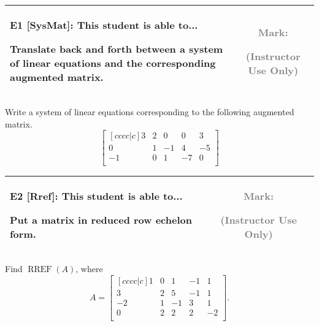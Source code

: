 \documentclass[12pt]{article}
\newcommand{\standardQuestion}[2]{
\begin{center}
  \begin{tabular}{|l|c|}
  \hline
    \parbox{5in}{
      \textbf{#1}: This student is able to...\\
      #2
    }
  &
    \parbox{1in}{
      \vspace{0.1in}
      \footnotesize \textcolor{gray}{Mark:}
      \vspace{0.7in}

      \tiny \textcolor{gray}{(Instructor Use Only)}
    }
  \\\hline
  \end{tabular}
\end{center}
}
\begin{document}




\standardQuestion{E1 [SysMat]}{
  Translate back and forth between a system of linear equations and the corresponding augmented matrix.
}

Write a system of linear equations corresponding to the following
augmented matrix.
\[
\begin{bmatrix}[cccc|c]
3 & 2 & 0 & 0 & 3 \\
0 & 1 & -1 & 4 & -5 \\
-1 & 0 & 1 & -7 & 0 \\
\end{bmatrix}
\]


\newpage



\standardQuestion{E2 [Rref]}{
  Put a matrix in reduced row echelon form.
}

Find \(\operatorname{RREF}(A)\), where
\[
  A
=
  \begin{bmatrix}[cccc|c]
  1 & 0 & 1 & -1 & 1 \\
  3 & 2 & 5 & -1 & 1 \\
  -2 & 1 & -1 & 3 & 1 \\
  0 & 2 & 2 & 2 & -2 \\
  \end{bmatrix}
.\]


\vfill
\end{document}

